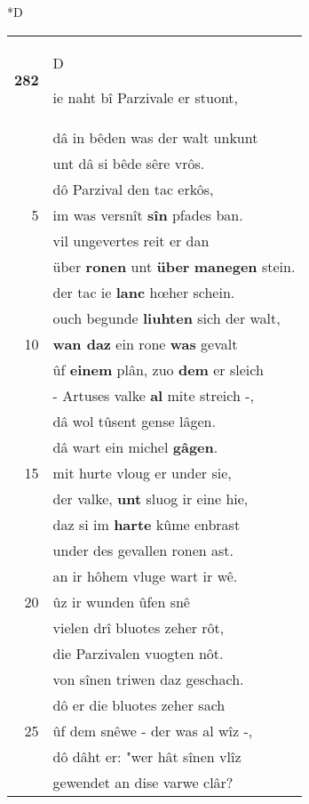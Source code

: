 \documentclass[8pt,a4paper,notitlepage]{article}
\begin{document}
\begin{table}[ht]
\begin{minipage}[t]{0.5\linewidth}
\small
\begin{center}*D
\end{center}
\begin{tabular}{rl}
\textbf{282} & \begin{large}D\end{large}ie naht bî Parzivale er stuont,\\ 
 & dâ in bêden was der walt unkunt\\ 
 & unt dâ si bêde sêre vrôs.\\ 
 & dô Parzival den tac erkôs,\\ 
5 & im was versnît \textbf{sîn} pfades ban.\\ 
 & vil ungevertes reit er dan\\ 
 & über \textbf{ronen} unt \textbf{über} \textbf{manegen} stein.\\ 
 & der tac ie \textbf{lanc} hœher schein.\\ 
 & ouch begunde \textbf{liuhten} sich der walt,\\ 
10 & \textbf{wan daz} ein rone \textbf{was} gevalt\\ 
 & ûf \textbf{einem} plân, zuo \textbf{dem} er sleich\\ 
 & - Artuses valke \textbf{al} mite streich -,\\ 
 & dâ wol tûsent gense lâgen.\\ 
 & dâ wart ein michel \textbf{gâgen}.\\ 
15 & mit hurte vloug er under sie,\\ 
 & der valke, \textbf{unt} sluog ir eine hie,\\ 
 & daz si im \textbf{harte} kûme enbrast\\ 
 & under des gevallen ronen ast.\\ 
 & an ir hôhem vluge wart ir wê.\\ 
20 & ûz ir wunden ûfen snê\\ 
 & vielen drî bluotes zeher rôt,\\ 
 & die Parzivalen vuogten nôt.\\ 
 & von sînen triwen daz geschach.\\ 
 & dô er die bluotes zeher sach\\ 
25 & ûf dem snêwe - der was al wîz -,\\ 
 & dô dâht er: "wer hât sînen vlîz\\ 
 & gewendet an dise varwe clâr?\\ 

\end{tabular}
\end{minipage}
\end{table}
\end{document}
